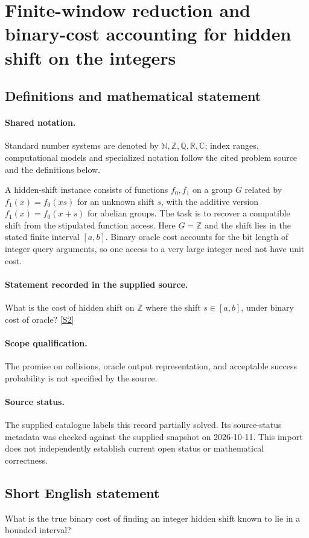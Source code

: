 \documentclass[11pt]{article}
\newcommand{\sref}[2]{\hyperlink{source:#1:#2}{[S#2]}}
\begin{document}
\section{Finite-window reduction and binary-cost accounting for hidden shift on the integers}\label{statement}

\subsection{Definitions and mathematical statement}

\paragraph{Shared notation.}Standard number systems are denoted by $\mathbb N,\mathbb Z,\mathbb Q,\mathbb R,\mathbb C$; index ranges, computational models and specialized notation follow the cited problem source and the definitions below.


A hidden-shift instance consists of functions $f_0,f_1$ on a group $G$ related by $f_1(x)=f_0(xs)$ for an unknown shift $s$, with the additive version $f_1(x)=f_0(x+s)$ for abelian groups. The task is to recover a compatible shift from the stipulated function access. Here $G=\mathbb Z$ and the shift lies in the stated finite interval $[a,b]$. Binary oracle cost accounts for the bit length of integer query arguments, so one access to a very large integer need not have unit cost.
\paragraph{Statement recorded in the supplied source.}
What is the cost of hidden shift on $\mathbb Z$ where the shift $s\in [a,b]$, under binary cost of oracle? \sref{statement}{2}
\paragraph{Scope qualification.}
The promise on collisions, oracle output representation, and acceptable success probability is not specified by the source.
\paragraph{Source status.}
The supplied catalogue labels this record partially solved. Its source-status metadata was checked against the supplied snapshot on 2026-10-11. This import does not independently establish current open status or mathematical correctness.
\subsection{Short English statement}
What is the true binary cost of finding an integer hidden shift known to lie in a bounded interval?
\end{document}
